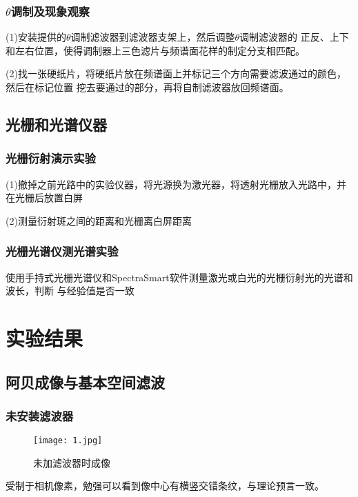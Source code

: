 \documentclass[12pt,a4paper]{article}
\begin{document}
        \subsubsection{$\theta $调制及现象观察}
            (1)安装提供的$\theta $调制滤波器到滤波器支架上，然后调整$\theta $调制滤波器的
            正反、上下和左右位置，使得调制器上三色滤片与频谱面花样的制定分支相匹配。\par
            (2)找一张硬纸片，将硬纸片放在频谱面上并标记三个方向需要滤波通过的颜色，然后在标记位置
            挖去要通过的部分，再将自制滤波器放回频谱面。

    \subsection{光栅和光谱仪器}
        \subsubsection{光栅衍射演示实验}
            (1)撤掉之前光路中的实验仪器，将光源换为激光器，将透射光栅放入光路中，并在光栅后放置白屏\par
            (2)测量衍射斑之间的距离和光栅离白屏距离

        \subsubsection{光栅光谱仪测光谱实验}
            使用手持式光栅光谱仪和SpectraSmart软件测量激光或白光的光栅衍射光的光谱和波长，判断
            与经验值是否一致

\section{实验结果}
    \subsection{阿贝成像与基本空间滤波}
        \subsubsection{未安装滤波器}
            \begin{figure}[H]
                \centering
                \texttt{[image: 1.jpg]}
                \caption{未加滤波器时成像}
            \end{figure}  

        受制于相机像素，勉强可以看到像中心有横竖交错条纹，与理论预言一致。
\end{document}
